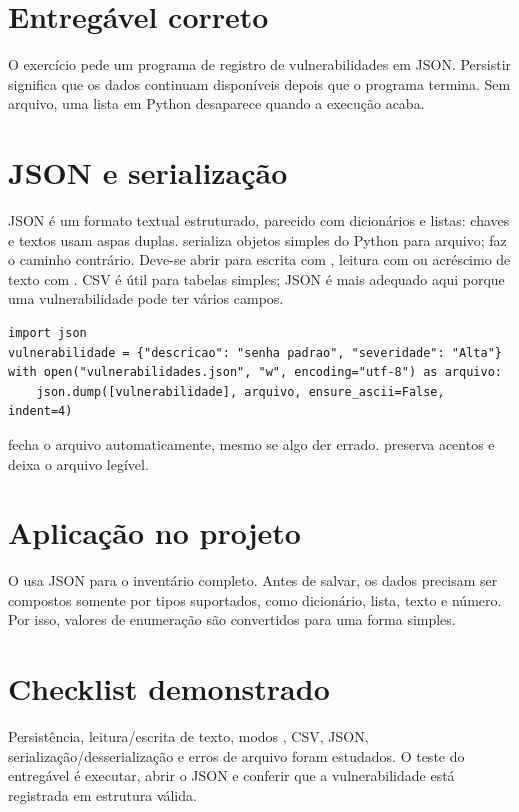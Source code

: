 \documentclass[11pt,a4paper]{article}
\begin{document}
\section*{Entregável correto}
O exercício pede um programa de registro de vulnerabilidades em JSON. Persistir significa que os dados continuam disponíveis depois que o programa termina. Sem arquivo, uma lista em Python desaparece quando a execução acaba.
\section*{JSON e serialização}
JSON é um formato textual estruturado, parecido com dicionários e listas: chaves e textos usam aspas duplas.  serializa objetos simples do Python para arquivo;  faz o caminho contrário. Deve-se abrir para escrita com , leitura com  ou acréscimo de texto com . CSV é útil para tabelas simples; JSON é mais adequado aqui porque uma vulnerabilidade pode ter vários campos.
\begin{lstlisting}
import json
vulnerabilidade = {"descricao": "senha padrao", "severidade": "Alta"}
with open("vulnerabilidades.json", "w", encoding="utf-8") as arquivo:
    json.dump([vulnerabilidade], arquivo, ensure_ascii=False, indent=4)
\end{lstlisting}
 fecha o arquivo automaticamente, mesmo se algo der errado.  preserva acentos e  deixa o arquivo legível.
\section*{Aplicação no projeto}
O  usa JSON para o inventário completo. Antes de salvar, os dados precisam ser compostos somente por tipos suportados, como dicionário, lista, texto e número. Por isso, valores de enumeração são convertidos para uma forma simples.
\section*{Checklist demonstrado}
Persistência, leitura/escrita de texto, modos , CSV, JSON, serialização/desserialização e erros de arquivo foram estudados. O teste do entregável é executar, abrir o JSON e conferir que a vulnerabilidade está registrada em estrutura válida.
\end{document}
